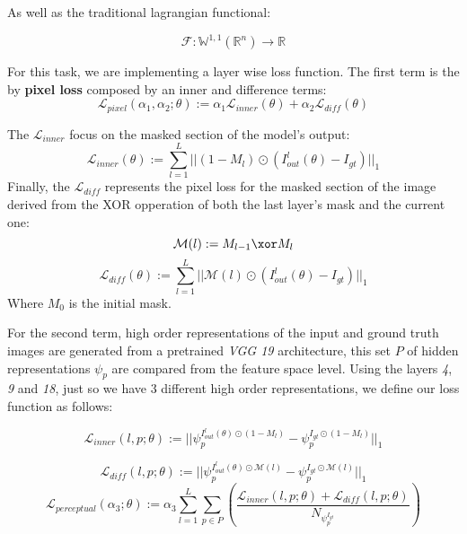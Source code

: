 \documentclass[draft]{agujournal2019}
\begin{document}
As well as the traditional lagrangian functional:

\begin{equation}
    \boldsymbol{\mathcal{F}}: \mathbb{W}^{1,1}(\mathbb{R}^n) \to \mathbb{R}
\end{equation}

For this task, we are implementing a layer wise loss function. The first term is the by \textbf{pixel loss} composed by an inner and difference terms:
\begin{equation}
    \mathcal{L}_{pixel}(\alpha_1, \alpha_2; \theta) := \alpha_1 \mathcal{L}_{inner}(\theta) + \alpha_2 \mathcal{L}_{diff}(\theta)
\end{equation}

The $\mathcal{L}_{inner}$ focus on the masked section of the model's output:
\begin{equation}
    \mathcal{L}_{inner}(\theta) := \sum_{l = 1}^{L} ||(1-M_l) \odot (I_{out}^l(\theta) - I_{gt})||_{1}
\end{equation}
Finally, the $\mathcal{L}_{diff}$ represents the pixel loss for the masked section of the image derived from the XOR opperation of both the last layer's mask and the current one:
\begin{equation}
    \mathcal{M}(l) := M_{l - 1} \xor M_{l}
\end{equation}
\begin{equation}
    \mathcal{L}_{diff}(\theta) := \sum_{l = 1}^{L} ||\mathcal{M}(l)\odot(I_{out}^l(\theta) - I_{gt})||_1
\end{equation}
Where $M_0$ is the initial mask.

For the second term, high order representations of the input and ground truth images are generated from a pretrained \textit{VGG 19} architecture, this set $P$ of hidden representations $\psi_p$ are compared from the feature space level. Using the layers \textit{4}, \textit{9} and \textit{18}, just so we have 3 different high order representations, we define our loss function as follows:

\begin{equation}
    \mathcal{L}_{inner}(l, p;\theta) := ||\psi_p^{I_{out}^l(\theta)\odot (1-M_l)}- \psi_p^{I_{gt}\odot (1-M_l)}||_1
\end{equation}

\begin{equation}
    \mathcal{L}_{diff}(l, p; \theta) := ||\psi_p^{I_{out}^l(\theta)\odot \mathcal{M}(l)}- \psi_p^{I_{gt}\odot \mathcal{M}(l)}||_1
\end{equation}
\begin{equation}
    \mathcal{L}_{perceptual}(\alpha_3 ;\theta) := \alpha_3\sum_{l = 1}^{L}\sum_{p \in P} \left(\frac{\mathcal{L}_{inner}(l, p; \theta) + \mathcal{L}_{diff}(l, p;\theta)}{N_{\psi_{p}^{I_{gt}}}}\right)
\end{equation}
\end{document}
